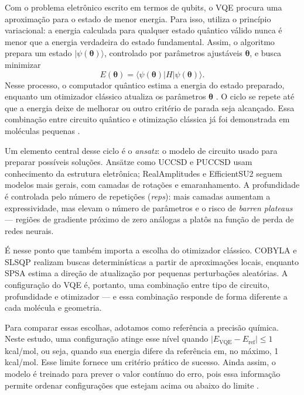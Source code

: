 Com o problema eletrônico escrito em termos de qubits, o VQE procura uma
aproximação para o estado de menor energia. Para isso, utiliza o princípio
variacional: a energia calculada para qualquer estado quântico válido nunca é
menor que a energia verdadeira do estado fundamental. Assim, o algoritmo prepara
um estado $\lvert\psi(\boldsymbol{\theta})\rangle$, controlado por parâmetros
ajustáveis $\boldsymbol{\theta}$, e busca minimizar
\begin{equation}
 E(\boldsymbol{\theta}) =
 \langle\psi(\boldsymbol{\theta})\rvert H
 \lvert\psi(\boldsymbol{\theta})\rangle .
\end{equation}
Nesse processo, o computador quântico estima a energia do estado preparado,
enquanto um otimizador clássico atualiza os parâmetros
$\boldsymbol{\theta}$ \cite{mcclean2016theory}. O ciclo se repete até que a
energia deixe de melhorar ou outro critério de parada seja alcançado. Essa
combinação entre circuito quântico e otimização clássica já foi demonstrada em
moléculas pequenas \cite{kandala2017hardware}.

Um elemento central desse ciclo é o \textit{ansatz}: o modelo de circuito usado
para preparar possíveis soluções. Ansätze como UCCSD e PUCCSD usam conhecimento
da estrutura eletrônica; RealAmplitudes e EfficientSU2 seguem modelos mais gerais,
com camadas de rotações e emaranhamento. A profundidade é controlada pelo número
de repetições (\textit{reps}): mais camadas aumentam a expressividade, mas elevam
o número de parâmetros e o risco de \textit{barren plateaus}
\cite{mcclean2018barren} — regiões de gradiente próximo de zero análogas a
platôs na função de perda de redes neurais.

É nesse ponto que também importa a escolha do otimizador clássico. COBYLA e
SLSQP realizam buscas determinísticas a partir de aproximações locais, enquanto
SPSA estima a direção de atualização por pequenas perturbações aleatórias. A
configuração do VQE é, portanto, uma combinação entre tipo de circuito,
profundidade e otimizador — e essa combinação responde de forma diferente a cada
molécula e geometria.

Para comparar essas escolhas, adotamos como referência a precisão química. Neste
estudo, uma configuração atinge esse nível quando
$\lvert E_{\mathrm{VQE}}-E_{\mathrm{ref}}\rvert\leq 1$ kcal/mol, ou seja,
quando sua energia difere da referência em, no máximo, 1 kcal/mol. Esse limite
fornece um critério prático de sucesso. Ainda assim, o modelo é treinado
para prever o valor contínuo do erro, pois essa informação permite ordenar
configurações que estejam acima ou abaixo do limite
\cite{petruzielo2012chemical}.

